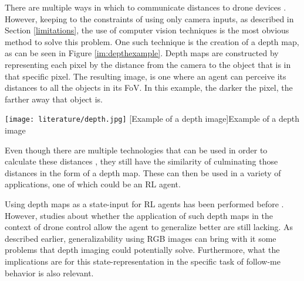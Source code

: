 There are multiple ways in which to communicate distances to drone devices \cite{acousticdronefollower, DepthAndStackResearch}. 
However, keeping to the constraints of using only camera inputs, as described in Section 
\ref{limitations}, the use of computer vision techniques is the most obvious method to solve 
this problem. One such technique is the creation of a depth map, as can be seen in Figure \ref{im:depthexample}.
Depth maps are constructed by representing each pixel by the distance from the camera to the 
object that is in that specific pixel. The resulting image, is one where an agent can 
perceive its distances to all the objects in its FoV. In this example, the darker the pixel, 
the farther away that object is.

\begin{Figure}
    \centering
    \texttt{[image: literature/depth.jpg]}
    [Example of a depth image]{Example of a depth image \cite{depthimageexample}}
    \label{im:depthexample}
\end{Figure}

Even though there are multiple technologies that can be used in order to calculate these 
distances \cite{lidarinselfdrivingcar, stereovision, DepthFromMonocularImage}, they still have 
the similarity of culminating those distances in the form of a depth map. These can then be 
used in a variety of applications, one of which could be an RL agent. 

Using depth maps as a state-input for RL agents has been performed before \cite{iowamasterthesis, AirSimDroneNavigation, DepthAndStackResearch}. 
However, studies about whether the application of such depth maps in the context of drone control 
allow the agent to generalize better are still lacking. As described earlier, generalizability using 
RGB images can bring with it some problems that depth imaging could potentially solve. Furthermore, 
what the implications are for this state-representation in the specific task of follow-me behavior 
is also relevant. 
